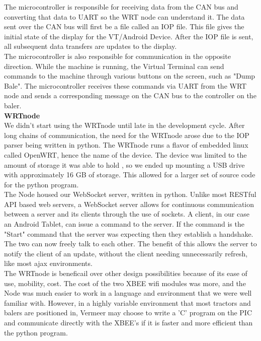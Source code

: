 \documentclass[paper=a4, fontsize=11pt]{scrartcl}
\numberwithin{equation}{section}		%
\numberwithin{figure}{section}			%
\numberwithin{table}{section}				%
\begin{document}
The microcontroller is responsible for receiving data from the CAN bus and converting that data to UART so the WRT node can understand it. The data sent over the CAN bus will first be a file called an IOP file. This file gives the initial state of the display for the VT/Android Device. After the IOP file is sent, all subsequent data transfers are updates to the display.  \\

The microcontroller is also responsible for communication in the opposite direction. While the machine is running, the Virtual Terminal can send commands to the machine through various buttons on the screen, such as "Dump Bale". The microcontroller receives these commands via UART from the WRT node and sends a corresponding message on the CAN bus to the controller on the baler. \\

\textbf{WRTnode} \\
We didn't start using the WRTnode until late in the development cycle. After long chains of communication, the need for the WRTnode arose due to the IOP parser being written in python. The WRTnode runs a flavor of embedded linux called OpenWRT, hence the name of the device. The device was limited to the amount of storage it was able to hold , so we ended up mounting a USB drive with approximately 16 GB of storage. This allowed for a larger set of source code for the python program. \\

The Node housed our WebSocket server, written in python. Unlike most RESTful API based web servers, a WebSocket server allows for continuous communication between a server and its clients through the use of sockets. A client, in our case an Android Tablet, can issue a command to the server. If the command is the "Start" command that the server was expecting then they establish a handshake. The two can now freely talk to each other. The benefit of this allows the server to notify the client of an update, without the client needing unnecessarily refresh, like most ajax environments. \\

The WRTnode is beneficail over other design possibilities because of its ease of use, mobility, cost. The cost of the two XBEE wifi modules was more, and the Node was much easier to work in a language and environment that we were well familiar with. However, in a highly variable environment that most tractors and balers are positioned in, Vermeer may choose to write a 'C' program on the PIC and communicate directly with the XBEE's if it is faster and more efficient than the python program. \\
\end{document}

